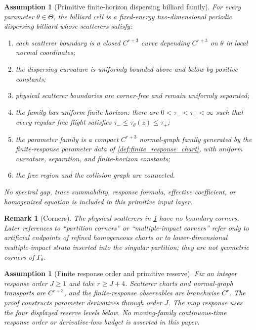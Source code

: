 \documentclass[11pt]{amsart}
\theoremstyle{compactplain}
\theoremstyle{compactdefinition}
\newtheorem{assumption}[theorem]{Assumption}
\theoremstyle{compactremark}
\newtheorem*{remark*}{Remark}
\newcommand{\Thetacal}{\Theta}
\begin{document}
\begin{assumption}[Primitive finite-horizon dispersing billiard family]
\label{ass:primitive_family}
For every parameter $\theta\in\Thetacal$, the billiard cell is a fixed-energy
two-dimensional periodic dispersing billiard whose scatterers satisfy:
\begin{enumerate}[label=\textup{(G\arabic*)},wide,labelindent=0pt]
  \item each scatterer boundary is a closed $C^{r+3}$ curve depending $C^{r+3}$
  on $\theta$ in local normal coordinates;
  \item the dispersing curvature is uniformly bounded above and below by positive
  constants;
  \item physical scatterer boundaries are corner-free and remain uniformly
  separated;
  \item the family has uniform finite horizon: there are
  $0<\tau_-<\tau_+<\infty$ such that every regular free flight satisfies
  $\tau_-\le\tau_\theta(z)\le\tau_+$;
  \item the parameter family is a compact $C^{r+3}$ normal-graph family generated
  by the finite-response parameter data of
  \cref{def:finite_response_chart}, with uniform curvature, separation, and
  finite-horizon constants;
  \item the free region and the collision graph are connected.
\end{enumerate}
No spectral gap, trace summability, response formula, effective coefficient, or
homogenized equation is included in this primitive input layer.
\end{assumption}

\begin{remark*}[Corners]
The physical scatterers in \cref{ass:primitive_family} have no boundary
corners.  Later references to ``partition corners'' or ``multiple-impact
corners'' refer only to artificial endpoints of refined homogeneous charts or
to lower-dimensional multiple-impact strata inserted into the singular
partition; they are not geometric corners of $\Gamma_\theta$.
\end{remark*}

\begin{assumption}[Finite response order and primitive reserve]
\label{ass:response_order_convention}
Fix an integer response order \(J\ge1\) and take \(r\ge J+4\).
Scatterer charts and normal-graph transports are \(C^{r+3}\), and the
finite-response observables are branchwise \(C^r\).  The proof constructs
parameter derivatives through order \(J\).  The map response uses the four
displayed reserve levels below.  No moving-family continuous-time response
order or derivative-loss budget is asserted in this paper.
\end{assumption}
\end{document}
